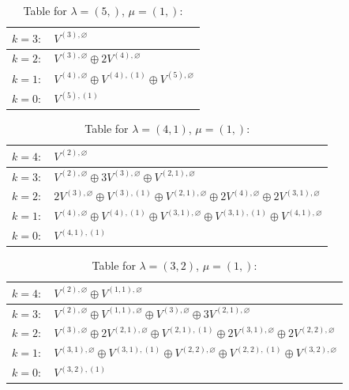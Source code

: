 \documentclass[a4paper,12pt]{article}
\begin{document}
\renewcommand{\arraystretch}{1.6} 
\begin{table}[H]
\centering
\caption{Table for $\lambda = (5,)$, $\mu = (1,)$:}
\begin{tabular}{|>{\centering\arraybackslash}p{15cm}|}
\hline
 $k = 3: \quad V^{(3), \varnothing} $ \\ \hline
 $k = 2: \quad V^{(3), \varnothing} \oplus 2 V^{(4), \varnothing} $ \\ \hline
 $k = 1: \quad V^{(4), \varnothing} \oplus V^{(4), (1)} \oplus V^{(5), \varnothing} $ \\ \hline
 $k = 0: \quad V^{(5), (1)} $ \\ \hline
\end{tabular}
\end{table}

\renewcommand{\arraystretch}{1.6} 
\begin{table}[H]
\centering
\caption{Table for $\lambda = (4, 1)$, $\mu = (1,)$:}
\begin{tabular}{|>{\centering\arraybackslash}p{15cm}|}
\hline
 $k = 4: \quad V^{(2), \varnothing} $ \\ \hline
 $k = 3: \quad V^{(2), \varnothing} \oplus 3 V^{(3), \varnothing} \oplus V^{(2, 1), \varnothing} $ \\ \hline
 $k = 2: \quad 2 V^{(3), \varnothing} \oplus V^{(3), (1)} \oplus V^{(2, 1), \varnothing} \oplus 2 V^{(4), \varnothing} \oplus 2 V^{(3, 1), \varnothing} $ \\ \hline
 $k = 1: \quad V^{(4), \varnothing} \oplus V^{(4), (1)} \oplus V^{(3, 1), \varnothing} \oplus V^{(3, 1), (1)} \oplus V^{(4, 1), \varnothing} $ \\ \hline
 $k = 0: \quad V^{(4, 1), (1)} $ \\ \hline
\end{tabular}
\end{table}

\renewcommand{\arraystretch}{1.6} 
\begin{table}[H]
\centering
\caption{Table for $\lambda = (3, 2)$, $\mu = (1,)$:}
\begin{tabular}{|>{\centering\arraybackslash}p{15cm}|}
\hline
 $k = 4: \quad V^{(2), \varnothing} \oplus V^{(1, 1), \varnothing} $ \\ \hline
 $k = 3: \quad V^{(2), \varnothing} \oplus V^{(1, 1), \varnothing} \oplus V^{(3), \varnothing} \oplus 3 V^{(2, 1), \varnothing} $ \\ \hline
 $k = 2: \quad V^{(3), \varnothing} \oplus 2 V^{(2, 1), \varnothing} \oplus V^{(2, 1), (1)} \oplus 2 V^{(3, 1), \varnothing} \oplus 2 V^{(2, 2), \varnothing} $ \\ \hline
 $k = 1: \quad V^{(3, 1), \varnothing} \oplus V^{(3, 1), (1)} \oplus V^{(2, 2), \varnothing} \oplus V^{(2, 2), (1)} \oplus V^{(3, 2), \varnothing} $ \\ \hline
 $k = 0: \quad V^{(3, 2), (1)} $ \\ \hline
\end{tabular}
\end{table}
\end{document}

